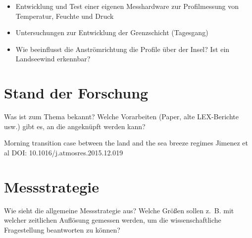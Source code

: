\documentclass[a4paper,11pt,DIV=calc,tablecaptionabove,headinclude,twoside]{article}
\begin{document}
\begin{itemize}


\item Entwicklung und Test einer eigenen Messhardware zur Profilmessung von
    Temperatur, Feuchte und Druck
\item Untersuchungen zur Entwicklung der Grenzschicht (Tagesgang)
\item Wie beeinflusst die Anströmrichtung die Profile über der Insel? Ist ein
    Landseewind erkennbar?
\end{itemize}
\section{Stand der Forschung}
Was ist zum Thema bekannt? Welche Vorarbeiten (Paper, alte LEX-Berichte usw.) gibt es, an die angeknüpft werden kann?

Morning transition case between the land and the sea breeze regimes Jimenez et
al
DOI: 10.1016/j.atmosres.2015.12.019

\section{Messstrategie}
Wie sieht die allgemeine Messstrategie aus? Welche Größen sollen z.~B. mit welcher zeitlichen Auflösung gemessen werden, um die wissenschaftliche Fragestellung beantworten zu können? 
\end{document}
